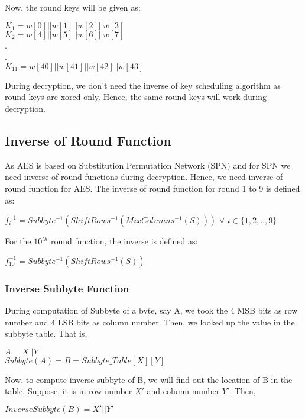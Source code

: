\documentclass[11pt]{article}
\begin{document}
Now, the round keys will be given as:
\begin{center}
    $K_1 = w[0] || w[1] || w[2] || w[3]$\\
    \vspace{1mm}
    $K_2 = w[4] || w[5] || w[6] || w[7]$\\
    \vspace{1mm}
    .\\
    .\\
    $K_{11} = w[40] || w[41] || w[42] || w[43]$\\
    \vspace{1mm}
\end{center}

During decryption, we don't need the inverse of key scheduling algorithm as round keys are xored only. Hence, the same round keys will work during decryption.

\subsection{Inverse of Round Function}
As AES is based on Substitution Permutation Network (SPN) and for SPN we need inverse of round functions during decryption. Hence, we need inverse of round function for AES. The inverse of round function for round 1 to 9 is defined as:
\begin{center}
    $f_i^{-1} = Subbyte^{-1}(ShiftRows^{-1}(MixColumns^{-1}(S)))$ $\forall$ $i \in \{1,2,..,9\}$
\end{center}
For the $10^{th}$ round function, the inverse is defined as:
\begin{center}
    $f_{10}^{-1} = Subbyte^{-1}(ShiftRows^{-1}(S))$
\end{center}

\subsubsection{Inverse Subbyte Function}
During computation of Subbyte of a byte, say A, we took the 4 MSB bits as row number and 4 LSB bits as column number. Then, we looked up the value in the subbyte table. That is, 
\begin{center}
    $A = X || Y$\\
    \vspace{1mm}
    $Subbyte(A) = B = Subbyte\_Table[X][Y]$
\end{center}
Now, to compute inverse subbyte of B, we will find out the location of B in the table. Suppose, it is in row number $X'$ and column number $Y'$. Then,
\begin{center}
    $InverseSubbyte(B) = X' || Y'$
\end{center}
\end{document}
